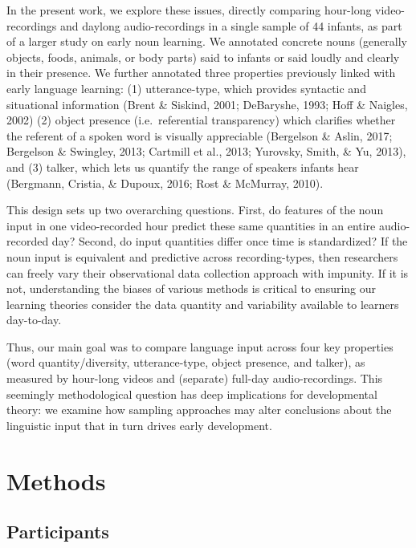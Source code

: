 \documentclass[floatsintext,man]{apa6}
\theoremstyle{definition}
\theoremstyle{definition}
\theoremstyle{definition}
\theoremstyle{remark}
\begin{document}
In the present work, we explore these issues, directly comparing
hour-long video-recordings and daylong audio-recordings in a single
sample of 44 infants, as part of a larger study on early noun learning.
We annotated concrete nouns (generally objects, foods, animals, or body
parts) said to infants or said loudly and clearly in their presence. We
further annotated three properties previously linked with early language
learning: (1) utterance-type, which provides syntactic and situational
information (Brent \& Siskind, 2001; DeBaryshe, 1993; Hoff \& Naigles,
2002) (2) object presence (i.e.~referential transparency) which
clarifies whether the referent of a spoken word is visually appreciable
(Bergelson \& Aslin, 2017; Bergelson \& Swingley, 2013; Cartmill et al.,
2013; Yurovsky, Smith, \& Yu, 2013), and (3) talker, which lets us
quantify the range of speakers infants hear (Bergmann, Cristia, \&
Dupoux, 2016; Rost \& McMurray, 2010).

This design sets up two overarching questions. First, do features of the
noun input in one video-recorded hour predict these same quantities in
an entire audio-recorded day? Second, do input quantities differ once
time is standardized? If the noun input is equivalent and predictive
across recording-types, then researchers can freely vary their
observational data collection approach with impunity. If it is not,
understanding the biases of various methods is critical to ensuring our
learning theories consider the data quantity and variability available
to learners day-to-day.

Thus, our main goal was to compare language input across four key
properties (word quantity/diversity, utterance-type, object presence,
and talker), as measured by hour-long videos and (separate) full-day
audio-recordings. This seemingly methodological question has deep
implications for developmental theory: we examine how sampling
approaches may alter conclusions about the linguistic input that in turn
drives early development.

\hypertarget{methods}{%
\section{Methods}\label{methods}}

\hypertarget{participants}{%
\subsection{Participants}\label{participants}}
\end{document}
